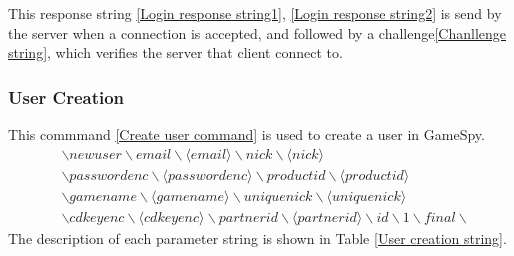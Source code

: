\documentclass[oneside,titlepage,a4paper]{report} %
\begin{document}
This response string \ref{Login response string1}, \ref{Login response string2} is send by the server when a connection is accepted, and followed by a challenge\ref{Chanllenge string}, which verifies the server that client connect to.



\subsubsection{User Creation}
This commmand \ref{Create user command} is used to create a user in GameSpy.
\begin{equation}\label{Create user command}
\begin{split}
&\backslash newuser \backslash email \backslash \langle email \rangle \backslash nick \backslash \langle nick \rangle \\& \backslash passwordenc \backslash \langle passwordenc \rangle 
\backslash productid \backslash \langle productid \rangle \\& \backslash gamename \backslash \langle gamename \rangle \backslash uniquenick \backslash \langle uniquenick \rangle \\& \backslash cdkeyenc \backslash \langle cdkeyenc \rangle \backslash partnerid \backslash \langle partnerid \rangle \backslash id \backslash 1 \backslash final \backslash
\end{split}	
\end{equation}
The description of each parameter string is shown in Table \ref{User creation string}.
\end{document}

